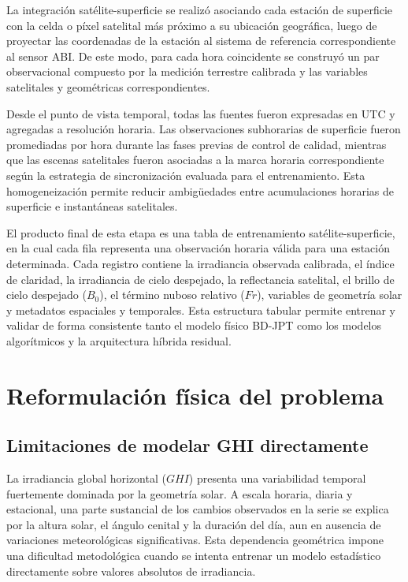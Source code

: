 \documentclass[../main.tex]{subfiles}
\begin{document}
La integración satélite-superficie se realizó asociando cada estación de superficie con la celda o píxel satelital más próximo a su ubicación geográfica, luego de proyectar las coordenadas de la estación al sistema de referencia correspondiente al sensor ABI. De este modo, para cada hora coincidente se construyó un par observacional compuesto por la medición terrestre calibrada y las variables satelitales y geométricas correspondientes.

Desde el punto de vista temporal, todas las fuentes fueron expresadas en UTC y agregadas a resolución horaria. Las observaciones subhorarias de superficie fueron promediadas por hora durante las fases previas de control de calidad, mientras que las escenas satelitales fueron asociadas a la marca horaria correspondiente según la estrategia de sincronización evaluada para el entrenamiento. Esta homogeneización permite reducir ambigüedades entre acumulaciones horarias de superficie e instantáneas satelitales.

El producto final de esta etapa es una tabla de entrenamiento satélite-superficie, en la cual cada fila representa una observación horaria válida para una estación determinada. Cada registro contiene la irradiancia observada calibrada, el índice de claridad, la irradiancia de cielo despejado, la reflectancia satelital, el brillo de cielo despejado ($B_0$), el término nuboso relativo ($Fr$), variables de geometría solar y metadatos espaciales y temporales. Esta estructura tabular permite entrenar y validar de forma consistente tanto el modelo físico BD-JPT como los modelos algorítmicos y la arquitectura híbrida residual.


\section{Reformulación física del problema}

\subsection{Limitaciones de modelar GHI directamente}

La irradiancia global horizontal ($GHI$) presenta una variabilidad temporal fuertemente dominada por la geometría solar. A escala horaria, diaria y estacional, una parte sustancial de los cambios observados en la serie se explica por la altura solar, el ángulo cenital y la duración del día, aun en ausencia de variaciones meteorológicas significativas. Esta dependencia geométrica impone una dificultad metodológica cuando se intenta entrenar un modelo estadístico directamente sobre valores absolutos de irradiancia.
\end{document}
